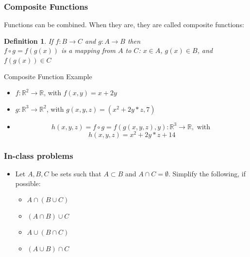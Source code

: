 \documentclass[aspectratio=169]{beamer}
\newtheorem{defn}{Definition}
\numberwithin{equation}{section}
\begin{document}
\begin{frame}
\frametitle{Composite Functions}
Functions can be combined.  When they are, they are called composite functions:
\begin{defn}
 If $f:B\rightarrow C$ and $g: A\rightarrow B$ then \\$f\circ g = f(g(x))$ is a mapping from $A$ to $C$: $x\in A$, $g(x)\in B$, and $f(g(x))\in C$
\end{defn}

\end{frame}


\begin{frame}{Composite Function Example}

\begin{itemize}
\item $f: \mathbb{R}^2\rightarrow \mathbb{R}$, with $f(x, y)=x+2y$ 

\item $g: \mathbb{R}^3\rightarrow \mathbb{R}^2$, with $g(x, y, z)=(x^2+2y*z, 7)$ \pause
\end{itemize}

\begin{itemize}
\item $$h(x,y,z)=f\circ g=f(g(x,y,z),y): \mathbb{R}^3\rightarrow\mathbb{R}, \text{ with }$$
$$h(x, y, z)=x^2+2y*z+14$$\pause

\end{itemize}

\end{frame}


\begin{frame}
\frametitle{In-class problems}

\begin{itemize}

\item[3.1.2] Let $A, B, C$ be sets such that $A\subset B$ and $A\cap C=\emptyset$.  Simplify the following, if possible:

\begin{itemize}
\item $A\cap(B\cup C)$ %
\item $(A\cap B)\cup C$ %
\item $A\cup(B\cap C)$ %
\item $(A\cup B)\cap C$ %


\end{itemize}

\end{itemize}
\end{frame}
\end{document}
